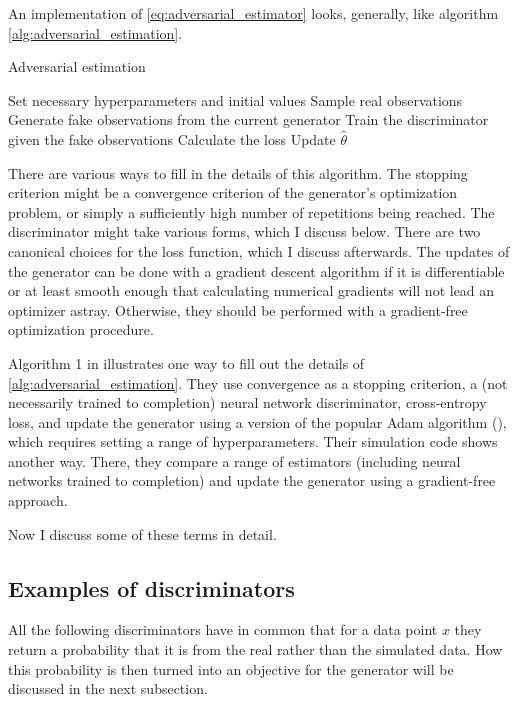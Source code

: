An implementation of \ref{eq:adversarial_estimator} looks, generally, like algorithm \ref{alg:adversarial_estimation}.

\begin{algorithm}
    \caption{Adversarial estimation}
    \label{alg:adversarial_estimation}
    \begin{algorithmic}
        \STATE Set necessary hyperparameters and initial values
        \STATE Sample real observations
            \STATE Generate fake observations from the current generator
            \STATE Train the discriminator given the fake observations
            \STATE Calculate the loss
            \STATE Update $\hat{\theta}$ %
        \ENDWHILE
    \end{algorithmic}
\end{algorithm}

There are various ways to fill in the details of this algorithm.
The stopping criterion might be a convergence criterion of the generator's optimization problem, or simply a sufficiently high number of repetitions being reached.
The discriminator might take various forms, which I discuss below.
There are two canonical choices for the loss function, which I discuss afterwards.
The updates of the generator can be done with a gradient descent algorithm if it is differentiable or at least smooth enough that calculating numerical gradients will not lead an optimizer astray.
Otherwise, they should be performed with a gradient-free optimization procedure.

Algorithm 1 in \textcite{kaji2023adversarial} illustrates one way to fill out the details of \ref{alg:adversarial_estimation}.
They use convergence as a stopping criterion, a (not necessarily trained to completion) neural network discriminator, cross-entropy loss, and update the generator using a version of the popular Adam algorithm (\cite{diederik2014adam}), which requires setting a range of hyperparameters.
Their simulation code shows another way. %
There, they compare a range of estimators (including neural networks trained to completion) and update the generator using a gradient-free approach.

Now I discuss some of these terms in detail.

\subsection{Examples of discriminators}
\label{sec:discriminators}
All the following discriminators have in common that for a data point $x$ they return a probability that it is from the real rather than the simulated data.
How this probability is then turned into an objective for the generator will be discussed in the next subsection.

